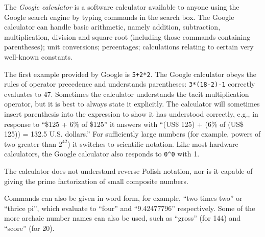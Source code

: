 \documentclass[12pt]{article}
\begin{document}
The {\em Google calculator} is a software calculator available to anyone using the Google search engine by typing commands in the search box. The Google calculator can handle basic arithmetic, namely addition, subtraction, multiplication, division and square root (including those commands containing parentheses); unit conversions; percentages; calculations relating to certain very well-known constants.

The first example provided by Google is \verb=5+2*2=. The Google calculator obeys the rules of operator precedence and understands parentheses: \verb=3*(18-2)-1= correctly evaluates to 47. Sometimes the calculator understands the tacit multiplication operator, but it is best to always state it explicitly. The calculator will sometimes insert parenthesis into the expression to show it has understood correctly, e.g., in response to ``\$125 + 6\% of \$125'' it answers with ``(US\$ 125) + (6\% of (US\$ 125)) = 132.5 U.S. dollars.'' For sufficiently large numbers (for example, powers of two greater than $2^{42}$) it switches to scientific notation. Like most hardware calculators, the Google calculator also responds to \verb=0^0= with 1.

The calculator does not understand reverse Polish notation, nor is it capable of giving the prime factorization of small composite numbers.

Commands can also be given in word form, for example, ``two times two'' or ``thrice pi'', which evaluate to ``four'' and ``9.42477796'' respectively. Some of the more archaic number names can also be used, such as ``gross'' (for 144) and ``score'' (for 20).
\end{document}
